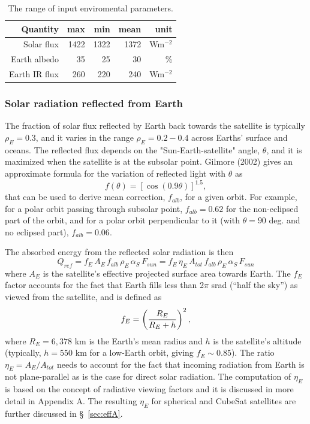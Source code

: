 \documentclass[]{aastex62}
\def\eq#1{\begin{equation} #1 \end{equation}}
\begin{document}
\begin{table}[t]
	\centering
	\caption{The range of input enviromental parameters. }
	\label{tab:inputsEnvParam}
	\begin{tabular}{r|r|r|r|r} %
		\hline
  	         Quantity & max    &   min   &  mean &  unit            \\
		\hline
              Solar flux   &  1422  &  1322  &  1372 & Wm$^{-2}$  \\
           Earth albedo  &    35    &    25    &     30  &   \%            \\ 
            Earth IR flux &  260    &   220   &    240 & Wm$^{-2}$   \\
 		\hline
	\end{tabular} 
\end{table}

\subsubsection{Solar radiation reflected from Earth} 

 
The fraction of solar flux reflected by Earth back towards the satellite is typically $\rho_E=0.3$, and it 
varies in the range $\rho_E=0.2-0.4$ across Earths' surface and oceans. The reflected flux depends on the
"Sun-Earth-satellite" angle, $\theta$, and it is maximized when the satellite is at the subsolar point. 
Gilmore (2002) gives an approximate formula for the variation of reflected light with $\theta$ as 
\eq{
                f(\theta) = \left[ \cos(0.9\theta)\right]^{1.5},
}
that can be used to derive mean correction, $f_{alb}$, for a given orbit. For example, for a polar orbit passing
through subsolar point, $f_{alb}=0.62$ for the non-eclipsed part of the orbit, and for a polar orbit perpendicular 
to it (with $\theta=90$ deg. and no eclipsed part), $f_{alb}=0.06$. 
 
The absorbed energy from the reflected solar radiation is then
\eq{
\label{eq:Qref}
Q_{ref} =  f_E \, A_E  \, f_{alb} \, \rho_E  \, \alpha_S  \,  F_{sun} = f_E \, \eta_E \, A_{tot} \, f_{alb} \, \rho_E  \, \alpha_S  \,  F_{sun} 
}
where $A_E$ is the satellite's effective projected surface area towards Earth. The $f_E$ factor  
accounts for the fact that Earth fills less than 2$\pi$ srad (``half the sky'') as viewed from the satellite, and is defined as 
\eq{
               f_E = \left( R_E \over R_E + h \right)^2,  
}
where $R_E=6,378$ km is the Earth's mean radius and $h$ is the satellite's altitude (typically, $h=550$ km 
for a low-Earth orbit, giving $f_E \sim 0.85$).  The ratio $\eta_E=A_E/A_{tot}$ needs to account for the fact
that incoming radiation from Earth is not plane-parallel as is the case for direct solar radiation. The computation
of $\eta_E$ is based on the concept of radiative viewing factors and it is discussed in more detail in Appendix A. 
The resulting $\eta_E$ for spherical and CubeSat satellites are further discussed in \S~\ref{sec:effA}. 
\end{document}

